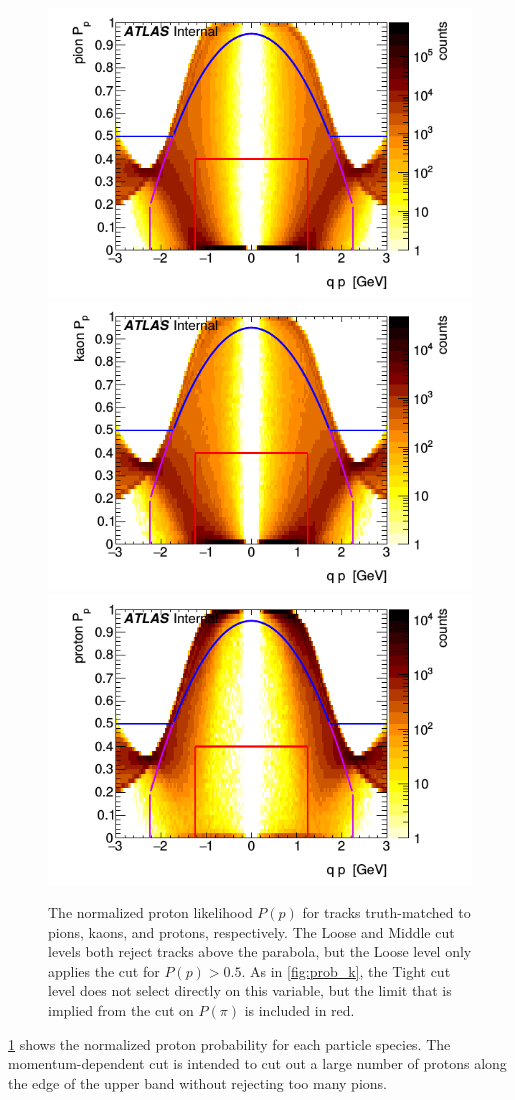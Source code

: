 \begin{figure}[t]
\includegraphics[width=.32\linewidth]{P_pion_p.png}
\includegraphics[width=.32\linewidth]{P_kaon_p.png}
\includegraphics[width=.32\linewidth]{P_proton_p.png}
\caption{The normalized proton likelihood $P(p)$ for tracks truth-matched to pions, kaons, and protons, respectively. The Loose and Middle cut levels both reject tracks above the parabola, but the Loose level only applies the cut for $P(p) > 0.5$. As in \cref{fig:prob_k}, the Tight cut level does not select directly on this variable, but the limit that is implied from the cut on $P(\pi)$ is included in red.}
\label{fig:prob_p}
\end{figure}

\cref{fig:prob_p} shows the normalized proton probability for each particle species.
The momentum-dependent cut is intended to cut out a large number of protons along the edge of the upper band without rejecting too many pions.

